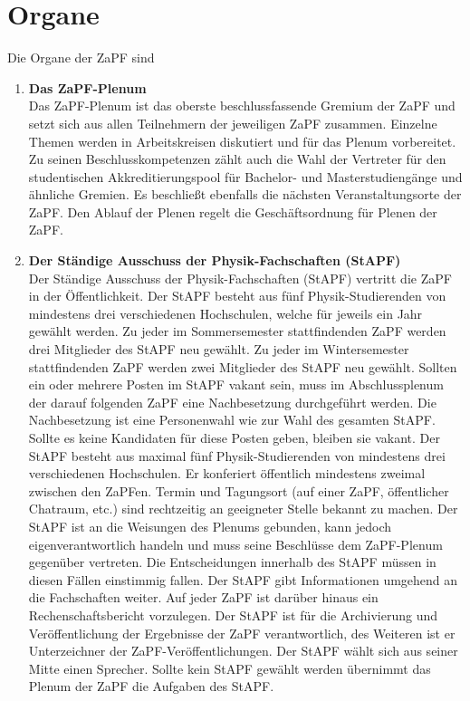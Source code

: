 \documentclass[draft,12pt,oneside]{scrreprt}
\begin{document}
\section{Organe}
  Die Organe der ZaPF sind
  \begin{enumerate}
    \item \textbf{Das ZaPF-Plenum}\\
          Das ZaPF-Plenum ist das oberste beschlussfassende Gremium der ZaPF
          und setzt sich aus allen Teilnehmern der jeweiligen ZaPF zusammen.
          Einzelne Themen werden in Arbeits\-kreisen diskutiert und für das
          Plenum vorbereitet. Zu seinen Beschlusskompetenzen zählt auch die
          Wahl der Vertreter für den studentischen Akkreditierungspool für
          Bachelor- und Masterstudiengänge und ähnliche Gremien.  Es beschließt
          ebenfalls die nächsten Veranstaltungsorte der ZaPF.  Den Ablauf der
          Plenen regelt die Geschäftsordnung für Plenen der ZaPF.
    \item \textbf{Der Ständige Ausschuss der Physik-Fachschaften (StAPF)}\\
          Der Ständige Ausschuss der Physik-Fachschaften (StAPF) vertritt die
          ZaPF in der Öffentlichkeit. Der StAPF besteht aus fünf Physik-Studierenden
          von mindestens drei verschiedenen Hochschulen, welche für jeweils ein
          Jahr gewählt werden. Zu jeder im Sommersemester stattfindenden ZaPF
          werden drei Mitglieder des StAPF neu gewählt. Zu jeder im Wintersemester
          stattfindenden ZaPF werden zwei Mitglieder des StAPF neu gewählt.
          Sollten ein oder mehrere Posten im StAPF vakant sein, muss im
          Abschlussplenum der darauf folgenden ZaPF eine Nachbesetzung
          durchgeführt werden. Die Nachbesetzung ist eine Personenwahl wie zur
          Wahl des gesamten StAPF. Sollte es keine Kandidaten für diese Posten
          geben, bleiben sie vakant. Der StAPF besteht aus maximal fünf
          Physik-Studierenden von mindestens drei verschiedenen Hochschulen.
          Er konferiert öffentlich mindestens zweimal zwischen den ZaPFen.
          Termin und Tagungsort (auf einer ZaPF, öffentlicher Chatraum, etc.)
          sind rechtzeitig an geeigneter Stelle bekannt zu machen. Der StAPF ist
          an die Weisungen des Plenums gebunden, kann jedoch eigenverantwortlich
          handeln und muss seine Beschlüsse dem ZaPF-Plenum gegenüber vertreten.
          Die Entscheidungen innerhalb des StAPF müssen in diesen Fällen einstimmig
          fallen. Der StAPF gibt Informationen umgehend an die Fachschaften weiter.
          Auf jeder ZaPF ist darüber hinaus ein Rechenschaftsbericht vorzulegen.
          Der StAPF ist für die Archivierung und Veröffentlichung der Ergebnisse
          der ZaPF verantwortlich, des Weiteren ist er Unterzeichner der
          ZaPF-Veröffentlichungen. Der StAPF wählt sich aus seiner Mitte einen
          Sprecher. Sollte kein StAPF gewählt werden übernimmt das Plenum der
          ZaPF die Aufgaben des StAPF.
  \end{enumerate}
\end{document}
